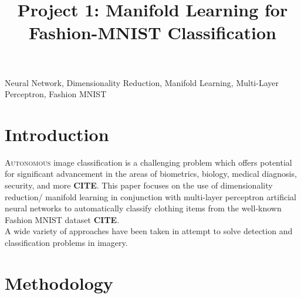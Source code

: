 \documentclass[conference]{IEEEtran}
\begin{document}
\title{Project 1: Manifold Learning for Fashion-MNIST Classification}
\author{

}

\maketitle


\begin{abstract}
	
\end{abstract} 

\begin{IEEEkeywords}
Neural Network, Dimensionality Reduction, Manifold Learning, Multi-Layer Perceptron, Fashion MNIST
\end{IEEEkeywords}


\section{Introduction} 

\lettrine{A}{utonomous} image classification is a challenging problem which offers potential for significant advancement in the areas of biometrics, biology, medical diagnosis, security, and more \textbf{CITE}.  This paper focuses on the use of dimensionality reduction/ manifold learning in conjunction with multi-layer perceptron artificial neural networks to automatically classify clothing items from the well-known Fashion MNIST dataset \textbf{CITE}.  \\
\indent A wide variety of approaches have been taken in attempt to solve detection and classification problems in imagery.


\section{Methodology} \label{Methodology}
\end{document}
